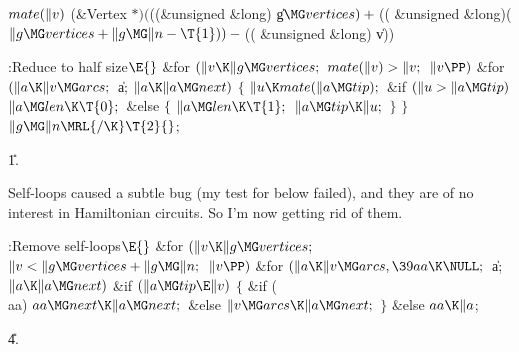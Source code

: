 \Y\B\4\D$\\{mate}(\|v)$ \5
(\&{Vertex} ${}{*})({}$((\&{unsigned} \&{long}) \|g${}\MG\\{vertices})+{}$((%
\&{unsigned} \&{long})(${}\|g\MG\\{vertices}+\|g\MG\|n-\T{1}))-{}$((%
\&{unsigned} \&{long}) \|v))\par
\Y\B\4:Reduce  to half size\X${}\E{}$\6
\&{for} ${}(\|v\K\|g\MG\\{vertices};{}$ ${}\\{mate}(\|v)>\|v;{}$ ${}\|v\PP){}$%
\1\6
\&{for} ${}(\|a\K\|v\MG\\{arcs};{}$ \|a; ${}\|a\K\|a\MG\\{next}){}$\5
${}\{{}$\1\6
${}\|u\K\\{mate}(\|a\MG\\{tip});{}$\6
\&{if} ${}(\|u>\|a\MG\\{tip}){}$\1\5
${}\|a\MG\\{len}\K\T{0};{}$\2\6
\&{else}\5
${}\{{}$\1\6
${}\|a\MG\\{len}\K\T{1};{}$\6
${}\|a\MG\\{tip}\K\|u;{}$\6
\4${}\}{}$\2\6
\4${}\}{}$\2\2\6
${}\|g\MG\|n\MRL{{/}{\K}}\T{2}{}$;\par
\U1.\fi

Self-loops caused a subtle bug (my test for 
below
failed), and they are of no interest in Hamiltonian circuits. So
I'm now getting rid of them.

\Y\B\4:Remove self-loops\X${}\E{}$\6
\&{for} ${}(\|v\K\|g\MG\\{vertices};{}$ ${}\|v<\|g\MG\\{vertices}+\|g\MG\|n;{}$
${}\|v\PP){}$\1\6
\&{for} ${}(\|a\K\|v\MG\\{arcs},\39\\{aa}\K\NULL;{}$ \|a; ${}\|a\K\|a\MG%
\\{next}){}$\1\6
\&{if} ${}(\|a\MG\\{tip}\E\|v){}$\5
${}\{{}$\1\6
\&{if} (\\{aa})\1\5
${}\\{aa}\MG\\{next}\K\|a\MG\\{next};{}$\2\6
\&{else}\1\5
${}\|v\MG\\{arcs}\K\|a\MG\\{next};{}$\2\6
\4${}\}{}$\2\6
\&{else}\1\5
${}\\{aa}\K\|a{}$;\2\2\2\par
\U4.\fi

